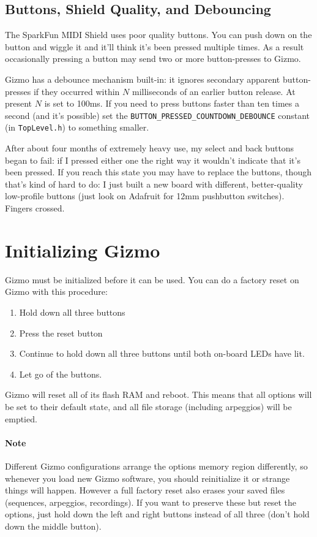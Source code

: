 \documentclass{article}
\begin{document}
\subsection{Buttons, Shield Quality, and Debouncing}
\label{debouncing}

The SparkFun MIDI Shield uses poor quality buttons.  You can push down on the button and wiggle it and it'll think it's been pressed multiple times.  As a result occasionally pressing a button may send two or more button-presses to Gizmo.

Gizmo has a debounce mechanism built-in: it ignores secondary apparent button-presses if they occurred within \(N\) milliseconds of an earlier button release.  At present \(N\) is set to 100ms.  If you need to press buttons faster than ten times a second (and it's possible) set the \texttt{BUTTON\_PRESSED\_COUNTDOWN\_DEBOUNCE} constant (in \texttt{TopLevel.h}) to something smaller.

After about four months of extremely heavy use, my select and back buttons began to fail: if I pressed either one the right way it wouldn't indicate that it's been pressed.  If you reach this state you may have to replace the buttons, though that's kind of hard to do: I just built a new board with different, better-quality low-profile buttons (just look on Adafruit for 12mm pushbutton switches).  Fingers crossed.

\clearpage
\section{Initializing Gizmo}

Gizmo must be initialized before it can be used.  You can do a factory reset on Gizmo with this procedure:

\begin{enumerate}
\item Hold down all three buttons
\item Press the reset button
\item Continue to hold down all three buttons until both on-board LEDs have lit.
\item Let go of the buttons.
\end{enumerate}

Gizmo will reset all of its flash RAM and reboot.  This means that all options will be set to their default state, and all file storage (including arpeggios) will be emptied.

\paragraph{Note} Different Gizmo configurations arrange the options memory region differently, so whenever you load new Gizmo software, you should reinitialize it or strange things will happen.  However a full factory reset also erases your saved files (sequences, arpeggios, recordings).  If you want to preserve these but reset the options, just hold down the left and right buttons instead of all three (don't hold down the middle button).
\end{document}
